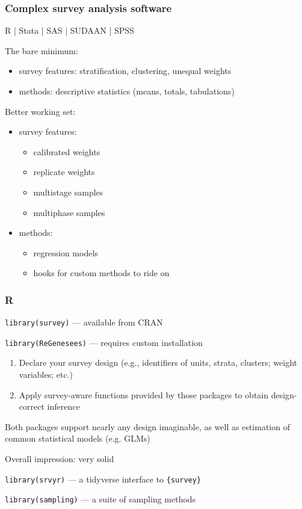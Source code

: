 \documentclass{beamer}
\begin{document}
\begin{frame}\frametitle{Complex survey analysis software}

R | Stata | SAS | SUDAAN | SPSS

\bigskip

The bare minimum:
\begin{itemize}
    \item survey features: stratification, clustering, unequal weights
    \item methods: descriptive statistics (means, totals, tabulations)
\end{itemize}

Better working set:
\begin{itemize}
    \item survey features:
    \begin{itemize}
        \item calibrated weights
        \item replicate weights
        \item multistage samples
        \item multiphase samples
    \end{itemize}
    \item methods:
    \begin{itemize}
        \item regression models
        \item hooks for custom methods to ride on
    \end{itemize}
\end{itemize}

\end{frame}


\begin{frame}\frametitle{R}

\texttt{library(survey)} --- available from CRAN \citep{lumley:2010}

\texttt{library(ReGenesees)} --- requires custom installation

\begin{enumerate}
    \item Declare your survey design (e.g., identifiers of units, strata, clusters; weight variables; etc.)
    \item Apply survey-aware functions provided by those packages to obtain design-correct inference
\end{enumerate}

Both packages support nearly any design imaginable, as well as estimation of common statistical models (e.g. GLMs)

\bigskip

Overall impression: very solid

\bigskip

\texttt{library(srvyr)} --- a tidyverse interface to \texttt{\{survey\}}

\texttt{library(sampling)} --- a suite of sampling methods \citep{tille:2006}

\end{frame}
\end{document}
